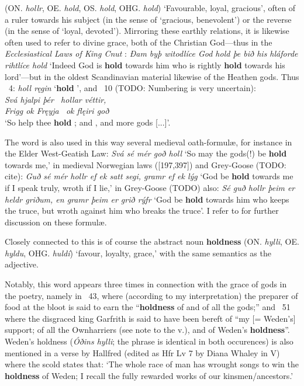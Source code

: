 \begin{itemize}
 (ON. \emph{hollr}, OE. \emph{hold}, OS. \emph{hold}, OHG. \emph{hold})
  ‘Favourable, loyal, gracious’, often of a ruler towards his subject (in the sense of ‘gracious, benevolent’) or the reverse (in the sense of ‘loyal, devoted’). Mirroring these earthly relations, it is likewise often used to refer to divine grace, both of the Christian God—thus in the \emph{Ecclesiastical Laws of King Cnut} : \emph{Ðam byþ witodlíce God hold þe bið his hláforde rihtlíce hold} ‘Indeed God is \textbf{hold} towards him who is rightly \textbf{hold} towards his lord’—but in the oldest Scandinavian material likewise of the Heathen gods.
  Thus \Lokasenna\ 4: \emph{holl ręgin} ‘\textbf{hold} ’, and \Oddrunargratr\ 10 (TODO: Numbering is very uncertain): \\ \emph{Svá hjalpi þér \hld\ hollar véttir, \\ Frigg ok Fręyja \hld\ ok flęiri goð} \\ ‘So help thee \textbf{hold} ;  and , and more gods [...]’.

  The word is also used in this way several medieval oath-formulæ, for instance in the Elder West-Geatish Law: \emph{Svá sé mér goð holl} ‘So may the gods(!) be \textbf{hold} towards me,’ in medieval Norwegian laws ([197,397]) and Grey-Goose (TODO: cite): \emph{Guð sé mér hollr ef ek satt segi, gramr ef ek lýg} ‘God be \textbf{hold} towards me if I speak truly, wroth if I lie,’ in Grey-Goose (TODO) also: \emph{Sé guð hollr þeim er heldr griðum, en gramr þeim er grið rýfr} ‘God be \textbf{hold} towards him who keeps the truce, but wroth against him who breaks the truce’. I refer to \textcite{Läffler1895} for further discussion on these formulæ.

   Closely connected to this is of course the abstract noun \textbf{holdness} (ON. \emph{hylli}, OE. \emph{hyldu}, OHG. \emph{huldí}) ‘favour, loyalty, grace,’ with the same semantics as the adjective.

  Notably, this word appears three times in connection with the grace of gods in the poetry, namely in \Grimnismal\ 43, where (according to my interpretation) the preparer of food at the bloot is said to earn the “\textbf{holdness} of  and of all the gods;” and \Grimnismal\ 51 where the disgraced king Garfrith is said to have been bereft of “my [= Weden’s] support; of all the Ownharriers (see note to the v.), and of Weden’s \textbf{holdness}”. Weden’s holdness (\emph{Óðins hylli}; the phrase is identical in both occurences) is also mentioned in a verse by Hallfred (edited as Hfr Lv 7 by Diana Whaley in  V) where the scold states that: ‘The whole race of man has wrought songs to win the \textbf{holdness} of Weden; I recall the fully rewarded works of our kinsmen/ancestors.’


\end{itemize}
